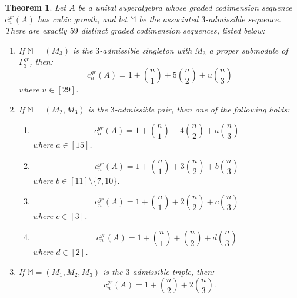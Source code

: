 \documentclass{amsart}
\newtheorem{thm}{Theorem}[section]
\theoremstyle{definition}
\theoremstyle{remark}
\numberwithin{equation}{section}
\def \Ga{\Gamma}
\def \M{\mathbb{M}}
\begin{document}
\begin{thm}\label{thm2.10}
	Let $A$ be a unital superalgebra whose graded codimension sequence $c_n^{gr}(A)$ has cubic growth, and let $\M$ be the associated $3$-admissible sequence. There are exactly $59$ distinct graded codimension sequences, listed below:
	\begin{enumerate}
		\item[(1)]
		If $\M=(M_3)$ is the $3$-admissible singleton with $M_3$ a proper submodule of $\Ga_3^{gr}$, then:
		\[
		c_n^{gr}(A)= 1+\binom{n}{1}+5\binom{n}{2}+u\binom{n}{3}
		\]
		where $u \in [29]$.
		\item[(2)]
		If $\M=(M_2,M_3)$ is the $3$-admissible pair, then one of the following holds:
		\begin{enumerate}
			\item[(i)]
			\[
			c_n^{gr}(A)= 1+\binom{n}{1}+4\binom{n}{2}+a\binom{n}{3}
			\]
			where $a \in [15]$.
			\item[(ii)]
			\[
			c_n^{gr}(A)= 1+\binom{n}{1}+3\binom{n}{2}+b\binom{n}{3}
			\]
			where $b \in [11] \setminus \{7,10\}$.
			\item[(iii)]
			\[
			c_n^{gr}(A)= 1+\binom{n}{1}+2\binom{n}{2}+c\binom{n}{3}
			\]
			where $c \in [3]$.
			\item[(iv)]
			\[
			c_n^{gr}(A)= 1+\binom{n}{1}+\binom{n}{2}+d\binom{n}{3}
			\]
			where $d \in [2]$.
		\end{enumerate}
		\item[(3)]
		If $\M=(M_1,M_2,M_3)$ is the $3$-admissible triple, then:
		\[
		c_n^{gr}(A)= 1+\binom{n}{2}+2\binom{n}{3}.
		\]
	\end{enumerate}
\end{thm}
\end{document}

